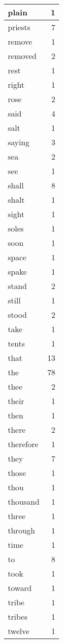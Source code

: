 \begin{center}
\begin{longtable}{l|r}
plain & 1 \\ \hline
priests & 7 \\ \hline
remove & 1 \\ \hline
removed & 2 \\ \hline
rest & 1 \\ \hline
right & 1 \\ \hline
rose & 2 \\ \hline
said & 4 \\ \hline
salt & 1 \\ \hline
saying & 3 \\ \hline
sea & 2 \\ \hline
see & 1 \\ \hline
shall & 8 \\ \hline
shalt & 1 \\ \hline
sight & 1 \\ \hline
soles & 1 \\ \hline
soon & 1 \\ \hline
space & 1 \\ \hline
spake & 1 \\ \hline
stand & 2 \\ \hline
still & 1 \\ \hline
stood & 2 \\ \hline
take & 1 \\ \hline
tents & 1 \\ \hline
that & 13 \\ \hline
the & 78 \\ \hline
thee & 2 \\ \hline
their & 1 \\ \hline
then & 1 \\ \hline
there & 2 \\ \hline
therefore & 1 \\ \hline
they & 7 \\ \hline
those & 1 \\ \hline
thou & 1 \\ \hline
thousand & 1 \\ \hline
three & 1 \\ \hline
through & 1 \\ \hline
time & 1 \\ \hline
to & 8 \\ \hline
took & 1 \\ \hline
toward & 1 \\ \hline
tribe & 1 \\ \hline
tribes & 1 \\ \hline
twelve & 1 \\ \hline

\end{longtable}
\end{center}
